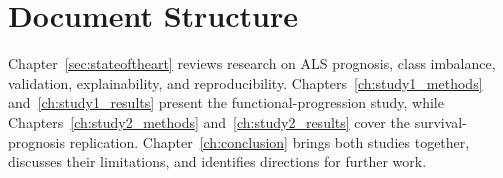 \section{Document Structure}
\label{subsec:structure}

Chapter~\ref{sec:stateoftheart} reviews research on ALS prognosis, class imbalance, validation, explainability, and reproducibility. Chapters~\ref{ch:study1_methods} and~\ref{ch:study1_results} present the functional-progression study, while Chapters~\ref{ch:study2_methods} and~\ref{ch:study2_results} cover the survival-prognosis replication. Chapter~\ref{ch:conclusion} brings both studies together, discusses their limitations, and identifies directions for further work.
